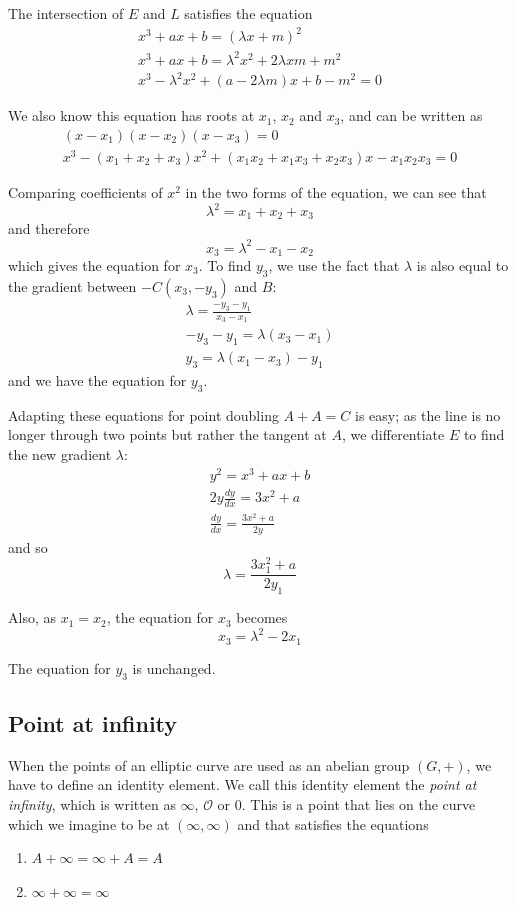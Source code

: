 \documentclass[a4paper]{article}
\begin{document}
The intersection of $E$ and $L$ satisfies the equation
\begin{align*}
    x^3 + ax + b = (\lambda x + m)^2 \\
    x^3 + ax + b = \lambda^2 x^2 + 2 \lambda x m + m^2 \\
    x^3 - \lambda^2 x^2 + (a - 2 \lambda m)x + b - m^2 = 0
\end{align*}

We also know this equation has roots at $x_1$, $x_2$ and $x_3$, and can be written as
\begin{align*}
    (x-x_1)(x-x_2)(x-x_3)=0 \\
    x^3 - (x_1 + x_2 + x_3)x^2 + (x_1x_2 + x_1x_3 + x_2x_3)x - x_1x_2x_3 = 0
\end{align*}

Comparing coefficients of $x^2$ in the two forms of the equation, we can see that \[\lambda^2 = x_1 + x_2 + x_3\] and therefore \[x_3 = \lambda^2 - x_1 - x_2\] which gives the equation for $x_3$. To find $y_3$, we use the fact that $\lambda$ is also equal to the gradient between $-C(x_3, -y_3)$ and $B$:
\begin{align*}
    \lambda = \frac{-y_3-y_1}{x_3-x_1} \\
    -y_3 - y_1 = \lambda(x_3-x_1) \\
    y_3 = \lambda(x_1-x_3)-y_1
\end{align*}
and we have the equation for $y_3$.\cite{proof}

Adapting these equations for point doubling $A + A = C$ is easy; as the line is no longer through two points but rather the tangent at $A$, we differentiate $E$ to find the new gradient $\lambda$:
\begin{align*}
    y^2 = x^3 + ax + b \\
    2y\frac{dy}{dx} = 3x^2 + a \\
    \frac{dy}{dx} = \frac{3x^2 + a}{2y}
\end{align*}
and so \[\lambda = \frac{3x_1^2 + a}{2y_1}\]

Also, as $x_1 = x_2$, the equation for $x_3$ becomes \[x_3 = \lambda^2-2x_1\]

The equation for $y_3$ is unchanged.

\subsection{Point at infinity}\label{poi}

When the points of an elliptic curve are used as an abelian group $(G, +)$, we have to define an identity element. We call this identity element the \textit{point at infinity}, which is written as $\infty$, $\mathcal{O}$ or $0$. This is a point that lies on the curve which we imagine to be at $(\infty, \infty)$ and that satisfies the equations
\begin{enumerate}
    \item $A + \infty = \infty + A = A$
    \item $\infty + \infty = \infty$\cite{guide}
\end{enumerate}
\end{document}

